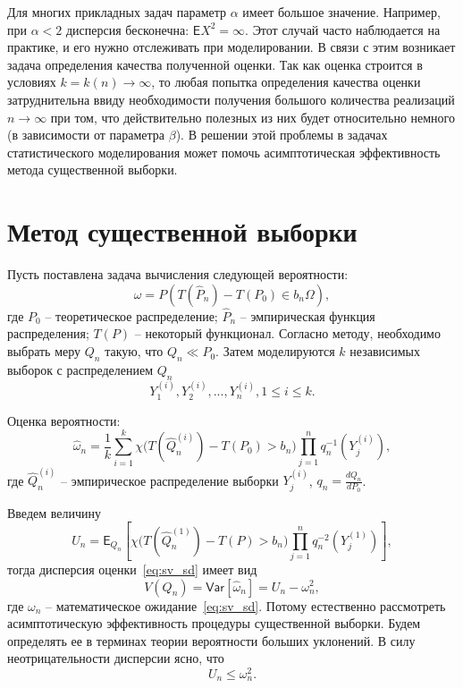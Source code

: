 \documentclass[12pt, specialist, subf, substylefile = spbu.rtx]{disser}
\newcommand{\Expect}{\mathsf{E}}
\newcommand{\Var}{\mathsf{Var}}
\begin{document}
Для многих прикладных задач параметр $\alpha$ имеет большое значение. Например, при $\alpha<2$ дисперсия бесконечна: $\Expect X^2=\infty.$ Этот случай часто наблюдается на практике, и его нужно отслеживать при моделировании. В связи с этим возникает задача определения качества полученной оценки. Так как оценка строится в условиях $k=k(n) \to \infty$, то любая попытка определения качества оценки затруднительна ввиду необходимости получения большого количества реализаций $n \to \infty$ при том, что действительно полезных из них будет относительно немного (в зависимости от параметра $\beta$). В решении этой проблемы в задачах статистического моделирования может помочь асимптотическая эффективность метода существенной выборки.

\section{Метод существенной выборки}

Пусть поставлена задача вычисления следующей вероятности:
\begin{equation}\label{eq:sv_pt}
\omega=P(T(\hat{P}_n)-T(P_0) \in b_n\Omega),
\end{equation}
где $P_0$ -- теоретическое распределение; $\hat{P}_n$ -- эмпирическая функция распределения; $T(P)$ -- некоторый функционал. Согласно методу, необходимо выбрать меру $Q_n$ такую, что $Q_n \ll P_0$. Затем моделируются $k$ независимых выборок с распределением $Q_n$
$$
Y_1^{(i)}, Y_2^{(i)}, ... , Y_n^{(i)}, 1 \le i \le k.
$$

Оценка вероятности:
\begin{equation}\label{eq:sv_sd}
\hat{\omega}_n=\frac{1}{k} \sum\limits_{i=1}^{k}
\chi \big(T(\hat{Q}^{(i)}_n)-T(P_0) > b_n\big)
\prod\limits_{j=1}^{n} q_n^{-1}(Y_j^{(i)}),
\end{equation}
где $\hat{Q}^{(i)}_n$ -- эмпирическое распределение выборки $Y^{(i)}_j$, $q_n=\frac{dQ_n}{dP_0}$.

Введем величину
$$
U_n=\Expect_{Q_n} 
\left[   
\chi \big(T(\hat{Q}^{(1)}_n)-T(P) > b_n\big)
\prod\limits_{j=1}^{n} q_n^{-2}(Y_j^{(1)})
\right],
$$
тогда дисперсия оценки~\eqref{eq:sv_sd} имеет вид
$$
V(Q_n)=\Var[\hat\omega_n]=U_n-\omega_n^2,
$$
где $\omega_n$ -- математическое ожидание~\eqref{eq:sv_sd}. Потому естественно рассмотреть асимптотическую эффективность процедуры существенной выборки. Будем определять ее в терминах теории вероятности больших уклонений. В силу неотрицательности дисперсии ясно, что
$$
U_n \le \omega_n^2.
$$
\end{document}
